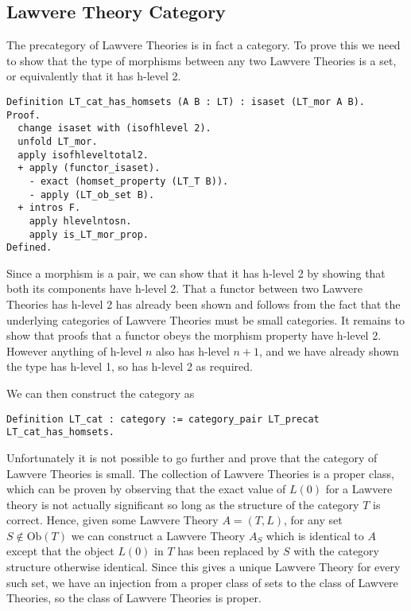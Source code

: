 \subsection{Lawvere Theory Category}
The precategory of Lawvere Theories is in fact a category. To prove this we need
to show that the type of morphisms between any two Lawvere Theories is a set, or
equivalently that it has h-level 2.
\begin{lstlisting}
Definition LT_cat_has_homsets (A B : LT) : isaset (LT_mor A B).
Proof.
  change isaset with (isofhlevel 2).
  unfold LT_mor.
  apply isofhleveltotal2.
  + apply (functor_isaset).
    - exact (homset_property (LT_T B)).
    - apply (LT_ob_set B).
  + intros F.
    apply hlevelntosn.
    apply is_LT_mor_prop.
Defined.
\end{lstlisting}
Since a morphism is a pair, we can show that it has h-level 2 by showing that
both its components have h-level 2. That a functor between two Lawvere Theories
has h-level 2 has already been shown and follows from the fact that the
underlying categories of Lawvere Theories must be small categories. It remains
to show that proofs that a functor obeys the morphism property have h-level 2.
However anything of h-level $n$ also has h-level $n+1$, and we have already
shown the type has h-level 1, so has h-level 2 as required.

We can then construct the category as
\begin{lstlisting}
Definition LT_cat : category := category_pair LT_precat LT_cat_has_homsets.
\end{lstlisting}

Unfortunately it is not possible to go further and prove that the category of
Lawvere Theories is small. The collection of Lawvere Theories is a proper class,
which can be proven by observing that the exact value of $L(0)$ for a Lawvere
theory is not actually significant so long as the structure of the category $T$
is correct. Hence, given some Lawvere Theory $A = (T, L)$, for any set $S\not\in
\text{Ob}(T)$ we can construct a Lawvere Theory $A_S$ which is identical to
$A$ except that the object $L(0)$ in $T$ has been replaced by $S$ with the
category structure otherwise identical. Since this gives a unique Lawvere Theory
for every such set, we have an injection from a proper class of sets to the
class of Lawvere Theories, so the class of Lawvere Theories is proper.